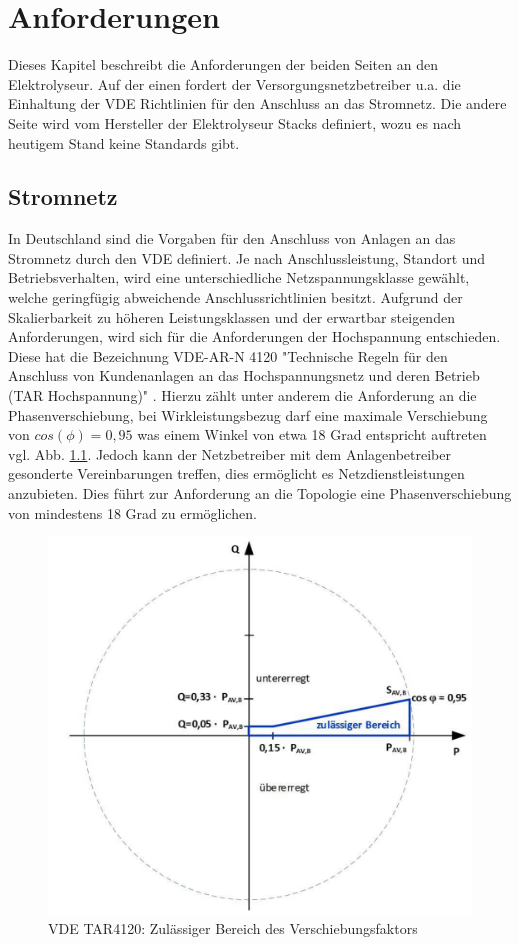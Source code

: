 \chapter{Anforderungen}
\label{chap:Anforderungen}
Dieses Kapitel beschreibt die Anforderungen der beiden Seiten an den Elektrolyseur. Auf der einen fordert der Versorgungsnetzbetreiber u.a. die Einhaltung der \gls{VDE} Richtlinien für den Anschluss an das Stromnetz. Die andere Seite wird vom Hersteller der Elektrolyseur Stacks definiert, wozu es nach heutigem Stand keine Standards gibt.
\section {Stromnetz} \label{sec:AnfStromnetz}
In Deutschland sind die Vorgaben für den Anschluss von Anlagen an das Stromnetz durch den \gls{VDE} definiert. Je nach Anschlussleistung, Standort und Betriebsverhalten, wird eine unterschiedliche Netzspannungsklasse gewählt, welche geringfügig abweichende Anschlussrichtlinien besitzt. Aufgrund der Skalierbarkeit zu höheren Leistungsklassen und der erwartbar steigenden Anforderungen, wird sich für die Anforderungen der Hochspannung entschieden. Diese hat die Bezeichnung VDE-AR-N 4120 "Technische Regeln für den Anschluss von Kundenanlagen an das Hochspannungsnetz und deren Betrieb (TAR Hochspannung)" \cite{VDEARN4120}.
Hierzu zählt unter anderem die Anforderung an die Phasenverschiebung, bei Wirkleistungsbezug darf eine maximale Verschiebung von $cos(\phi)=0,95$ was einem Winkel von etwa 18 Grad entspricht auftreten vgl. Abb. \ref{fig:tar4120pq}. Jedoch kann der Netzbetreiber mit dem Anlagenbetreiber gesonderte Vereinbarungen treffen, dies ermöglicht es Netzdienstleistungen anzubieten. Dies führt zur Anforderung an die Topologie eine Phasenverschiebung von mindestens 18 Grad zu ermöglichen.\\
\begin{figure}[H]
	\centering
	\includegraphics[width=0.6\linewidth]{content/Grafiken/TAR4120_PQ}
	\caption[Zulässiger Bereich des Verschiebungsfaktors cos $\phi$ bei Wirkleistungsbezug]{VDE TAR4120: Zulässiger Bereich des Verschiebungsfaktors \cite{VDEARN4120}}
	\label{fig:tar4120pq}
\end{figure}
